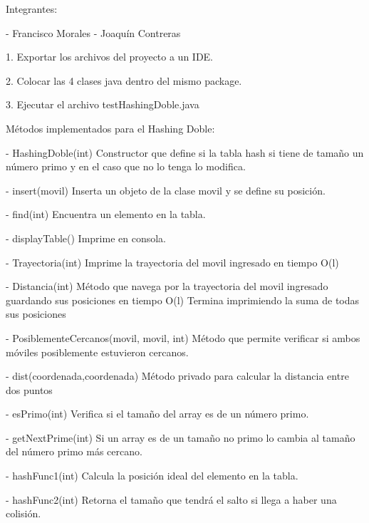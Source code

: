 Integrantes:

- Francisco Morales
- Joaquín Contreras

1. Exportar los archivos del proyecto a un IDE.

2. Colocar las 4 clases java dentro del mismo package.

3. Ejecutar el archivo testHashingDoble.java

Métodos implementados para el Hashing Doble:

- HashingDoble(int)	                        Constructor que define si la tabla hash si tiene de tamaño un número primo
                                                y en el caso que no lo tenga lo modifica.

- insert(movil) 	                              Inserta un objeto de la clase movil y se define su posición.

- find(int) 		                        Encuentra un elemento en la tabla.

- displayTable()	                              Imprime en consola.

- Trayectoria(int)	                        Imprime la trayectoria del movil ingresado en tiempo O(l)

- Distancia(int)                                Método que navega por la trayectoria del movil ingresado guardando sus
                                                posiciones en tiempo O(l)
                                                Termina imprimiendo la suma de todas sus posiciones

- PosiblementeCercanos(movil, movil, int)       Método que permite verificar si ambos móviles posiblemente estuvieron cercanos.        

- dist(coordenada,coordenada)                   Método privado para calcular la distancia entre dos puntos

- esPrimo(int)   	                              Verifica si el tamaño del array es de un número primo.

- getNextPrime(int) 	                        Si un array es de un tamaño no primo lo cambia al tamaño del número primo más cercano.

- hashFunc1(int)	                              Calcula la posición ideal del elemento en la tabla.

- hashFunc2(int)	                              Retorna el tamaño que tendrá el salto si llega a haber una colisión.